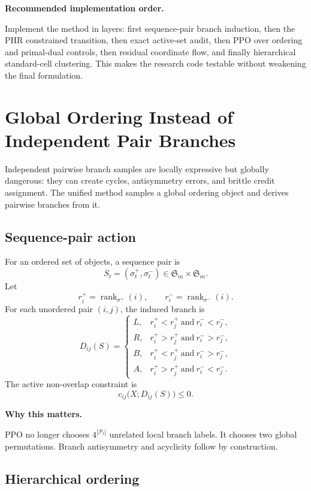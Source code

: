\documentclass[11pt]{article}
\newcommand{\Perm}{\mathfrak{S}}
\newcommand{\Pset}{\mathcal{P}}
\newcommand{\seqp}{\sigma^+}
\newcommand{\seqm}{\sigma^-}
\newcommand{\rankp}{r^+}
\newcommand{\rankm}{r^-}
\newcommand{\callout}[3]{%
\medskip\noindent\textbf{\textcolor{#1}{#2.}}\par\noindent #3\par\medskip
}
\begin{document}
\callout{blue!70!black}{Recommended implementation order}{Implement the method in layers: first sequence-pair branch induction, then the PHR constrained transition, then exact active-set audit, then PPO over ordering and primal-dual controls, then residual coordinate flow, and finally hierarchical standard-cell clustering. This makes the research code testable without weakening the final formulation.}

\section{Global Ordering Instead of Independent Pair Branches}

Independent pairwise branch samples are locally expressive but globally dangerous: they can create cycles, antisymmetry errors, and brittle credit assignment. The unified method samples a global ordering object and derives pairwise branches from it.

\subsection{Sequence-pair action}

For an ordered set of objects, a sequence pair is
\[
    S_t=(\seqp_t,\seqm_t)\in\Perm_m\times\Perm_m.
\]
Let
\[
    \rankp_i=\operatorname{rank}_{\seqp}(i),
    \qquad
    \rankm_i=\operatorname{rank}_{\seqm}(i).
\]
For each unordered pair $(i,j)$, the induced branch is
\[
D_{ij}(S)=
\begin{cases}
    L, & \rankp_i<\rankp_j\ \text{and}\ \rankm_i<\rankm_j,\\
    R, & \rankp_i>\rankp_j\ \text{and}\ \rankm_i>\rankm_j,\\
    B, & \rankp_i<\rankp_j\ \text{and}\ \rankm_i>\rankm_j,\\
    A, & \rankp_i>\rankp_j\ \text{and}\ \rankm_i<\rankm_j.
\end{cases}
\]
The active non-overlap constraint is
\[
    c_{ij}\bigl(X;D_{ij}(S)\bigr)\le0.
\]

\callout{green!70!black}{Why this matters}{PPO no longer chooses $4^{|\Pset_t|}$ unrelated local branch labels. It chooses two global permutations. Branch antisymmetry and acyclicity follow by construction.}

\subsection{Hierarchical ordering}
\end{document}
